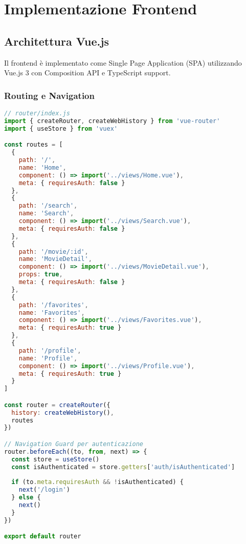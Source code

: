 \documentclass[11pt,a4paper]{article}
\begin{document}
\section{Implementazione Frontend}

\subsection{Architettura Vue.js}
Il frontend è implementato come Single Page Application (SPA) utilizzando Vue.js 3 con Composition API e TypeScript support.

\subsubsection{Routing e Navigation}
\begin{lstlisting}[language=JavaScript, caption=Vue Router Configuration]
// router/index.js
import { createRouter, createWebHistory } from 'vue-router'
import { useStore } from 'vuex'

const routes = [
  {
    path: '/',
    name: 'Home',
    component: () => import('../views/Home.vue'),
    meta: { requiresAuth: false }
  },
  {
    path: '/search',
    name: 'Search',
    component: () => import('../views/Search.vue'),
    meta: { requiresAuth: false }
  },
  {
    path: '/movie/:id',
    name: 'MovieDetail',
    component: () => import('../views/MovieDetail.vue'),
    props: true,
    meta: { requiresAuth: false }
  },
  {
    path: '/favorites',
    name: 'Favorites',
    component: () => import('../views/Favorites.vue'),
    meta: { requiresAuth: true }
  },
  {
    path: '/profile',
    name: 'Profile',
    component: () => import('../views/Profile.vue'),
    meta: { requiresAuth: true }
  }
]

const router = createRouter({
  history: createWebHistory(),
  routes
})

// Navigation Guard per autenticazione
router.beforeEach((to, from, next) => {
  const store = useStore()
  const isAuthenticated = store.getters['auth/isAuthenticated']
  
  if (to.meta.requiresAuth && !isAuthenticated) {
    next('/login')
  } else {
    next()
  }
})

export default router
\end{lstlisting}
\end{document}
